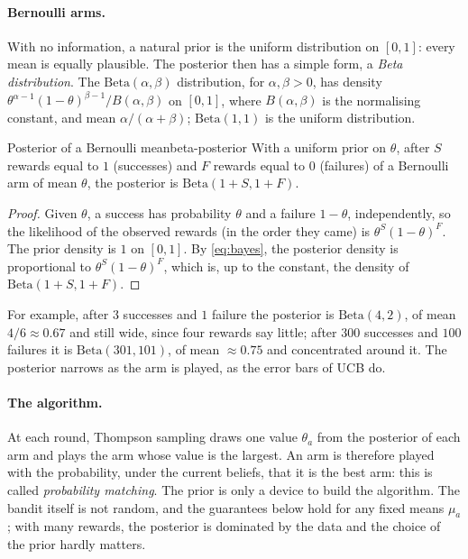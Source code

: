 \paragraph{Bernoulli arms.} With no information, a natural prior is the
uniform distribution on $[0, 1]$: every mean is equally plausible. The
posterior then has a simple form, a \emph{Beta distribution}. The
$\mathrm{Beta}(\alpha, \beta)$ distribution, for $\alpha, \beta > 0$, has
density $\theta^{\alpha - 1} (1 - \theta)^{\beta - 1} / B(\alpha, \beta)$
on $[0, 1]$, where $B(\alpha, \beta)$ is the normalising constant, and mean
$\alpha / (\alpha + \beta)$; $\mathrm{Beta}(1, 1)$ is the uniform
distribution.

\begin{proposition}{Posterior of a Bernoulli mean}{beta-posterior}
  With a uniform prior on $\theta$, after $S$ rewards equal to $1$
  (successes) and $F$ rewards equal to $0$ (failures) of a Bernoulli arm of
  mean $\theta$, the posterior is $\mathrm{Beta}(1 + S, 1 + F)$.
\end{proposition}

\begin{proof}
  Given $\theta$, a success has probability $\theta$ and a failure $1 -
  \theta$, independently, so the likelihood of the observed rewards (in
  the order they came) is $\theta^S (1 - \theta)^F$. The prior density is
  $1$ on $[0, 1]$. By \eqref{eq:bayes}, the posterior density is
  proportional to $\theta^S (1 - \theta)^F$, which is, up to the constant,
  the density of $\mathrm{Beta}(1 + S, 1 + F)$.
\end{proof}

For example, after $3$ successes and $1$ failure the posterior is
$\mathrm{Beta}(4, 2)$, of mean $4/6 \approx 0.67$ and still wide, since
four rewards say little; after $300$ successes and $100$ failures it is
$\mathrm{Beta}(301, 101)$, of mean $\approx 0.75$ and concentrated around
it. The posterior narrows as the arm is played, as the error bars of UCB do.

\paragraph{The algorithm.} At each round, Thompson sampling draws one
value $\theta_a$ from the posterior of each arm and plays the arm whose
value is the largest. An arm is therefore played with the probability,
under the current beliefs, that it is the best arm: this is called
\emph{probability matching}. The prior is only a device to build the
algorithm. The bandit itself is not random, and the guarantees below hold
for any fixed means $\mu_a$; with many rewards, the posterior is dominated
by the data and the choice of the prior hardly matters.

